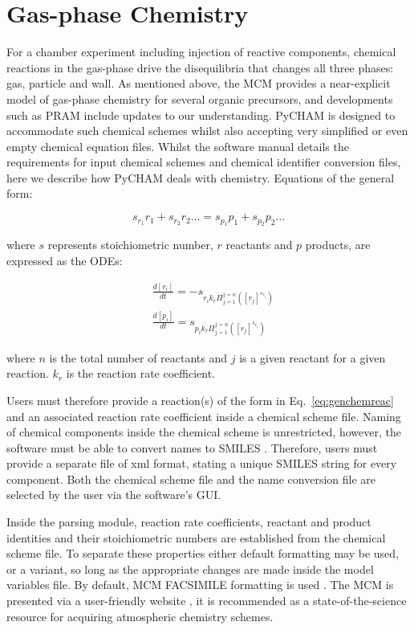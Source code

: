 \documentclass[gmd, manuscript]{copernicus}
\begin{document}
\section{Gas-phase Chemistry}\label{sec:photochem}

For a chamber experiment including injection of reactive components, chemical reactions in the gas-phase drive the disequilibria that changes all three phases: gas, particle and wall.  As mentioned above, the MCM provides a near-explicit model of gas-phase chemistry for several organic precursors, and developments such as PRAM include updates to our understanding.  PyCHAM is designed to accommodate such chemical schemes whilst also accepting very simplified or even empty chemical equation files.  Whilst the software manual details the requirements for input chemical schemes and chemical identifier conversion files, here we describe how PyCHAM deals with chemistry.  Equations of the general form:

\begin{equation} \label{eq:genchemreac}
s_{r_{1}}r_{1}+s_{r_{2}}r_{2} \ldots=s_{p_{1}}p_{1}+s_{p_{2}}p_{2}\ldots
\end{equation}

where $s$ represents stoichiometric number, $r$ reactants and $p$ products, are expressed as the ODEs:

\begin{align} \label{eq:genchemode}
	&\frac{d[r_{i}]}{dt} = -s_{r_{i}k_r\Pi_{j=1}^{j=n}\left([r_j]^{s_{r_{j}}}\right)}\\
	&\frac{d[p_{i}]}{dt} = s_{p_{i}k_r\Pi_{j=1}^{j=n}\left([r_j]^{s_{r_{j}}}\right)} 
\end{align}

where $n$ is the total number of reactants and $j$ is a given reactant for a given reaction.  $k_r$ is the reaction rate coefficient.

Users must therefore provide a reaction(s) of the form in Eq.~\ref{eq:genchemreac} and an associated reaction rate coefficient inside a chemical scheme file.  Naming of chemical components inside the chemical scheme is unrestricted, however, the software must be able to convert names to SMILES \citep{Weininger1988}.  Therefore, users must provide a separate file of xml format, stating a unique SMILES string for every component.  Both the chemical scheme file and the name conversion file are selected by the user via the software's GUI.

Inside the parsing module, reaction rate coefficients, reactant and product identities and their stoichiometric numbers are established from the chemical scheme file.  To separate these properties either default formatting may be used, or a variant, so long as the appropriate changes are made inside the model variables file.  By default, MCM FACSIMILE formatting is used \citep{Jenkin1997, Saunders2003}.  The MCM is presented via a user-friendly website \citep{MCM2020}, it is recommended as a state-of-the-science resource for acquiring atmospheric chemistry schemes.
\end{document}
